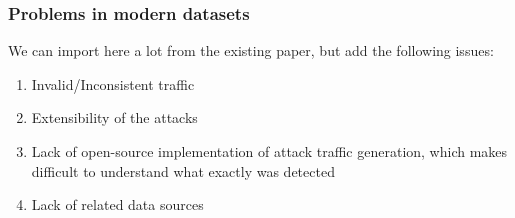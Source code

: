 \documentclass{article}
\begin{document}
\subsubsection{Problems in modern datasets}\label{Sec:problems}

We can import here a lot from the existing paper, but add the following issues:
\begin{enumerate}
\item Invalid/Inconsistent traffic
\item Extensibility of the attacks
\item Lack of open-source implementation of attack traffic generation, which makes difficult to understand what exactly was detected
\item Lack of related data sources
\end{enumerate}


%
%
%
\end{document}
